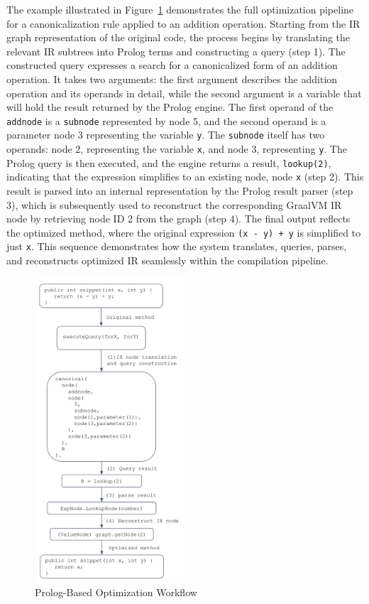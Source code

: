 The example illustrated in Figure~\ref{fig:diagram} demonstrates the full optimization pipeline for a canonicalization rule applied to an addition operation. Starting from the IR graph representation of the original code, the process begins by translating the relevant IR subtrees into Prolog terms and constructing a query (step 1). The constructed query expresses a search for a canonicalized form of an addition operation. It takes two arguments: the first argument describes the addition operation and its operands in detail, while the second argument is a variable that will hold the result returned by the Prolog engine. The first operand of the \texttt{addnode} is a \texttt{subnode} represented by node 5, and the second operand is a parameter node 3 representing the variable \texttt{y}. The \texttt{subnode} itself has two operands: node 2, representing the variable \texttt{x}, and node 3, representing \texttt{y}. The Prolog query is then executed, and the engine returns a result, \texttt{lookup(2)}, indicating that the expression simplifies to an existing node, node \texttt{x} (step 2). This result is parsed into an internal representation by the Prolog result parser (step 3), which is subsequently used to reconstruct the corresponding GraalVM IR node by retrieving node ID 2 from the graph (step 4). The final output reflects the optimized method, where the original expression \texttt{(x - y) + y} is simplified to just \texttt{x}. This sequence demonstrates how the system translates, queries, parses, and reconstructs optimized IR seamlessly within the compilation pipeline.

\begin{figure}
    \centering
    \includegraphics[width=0.5\textwidth]{./Packages/diagram.png}
    \caption{Prolog-Based Optimization Workflow}
    \label{fig:diagram}
\end{figure}